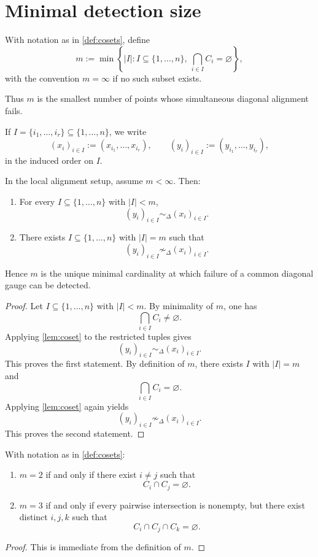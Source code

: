 \section{Minimal detection size}
\begin{definition}
	With notation as in \cref{def:cosets}, define
	\[
		m
		:=
		\min
		\left\{
		|I|:
		I\subseteq\{1,\dots,n\},
		\ \bigcap_{i\in I}C_i=\varnothing
		\right\},
	\]
	with the convention \(m=\infty\) if no such subset exists.
\end{definition}
Thus \(m\) is the smallest number of points whose simultaneous diagonal
alignment fails.
\begin{remark}
	If \(I=\{i_1,\dots,i_r\}\subseteq\{1,\dots,n\}\), we write
	\[
		(x_i)_{i\in I}:=(x_{i_1},\dots,x_{i_r}),
		\qquad
		(y_i)_{i\in I}:=(y_{i_1},\dots,y_{i_r}),
	\]
	in the induced order on \(I\).
\end{remark}
\begin{theorem}
	In the local alignment setup, assume \(m<\infty\). Then:
	\begin{enumerate}
		\item For every \(I\subseteq\{1,\dots,n\}\) with \(|I|<m\),
		      \[
			      (y_i)_{i\in I}\sim_\Delta (x_i)_{i\in I}.
		      \]
		\item There exists \(I\subseteq\{1,\dots,n\}\) with \(|I|=m\) such that
		      \[
			      (y_i)_{i\in I}\not\sim_\Delta (x_i)_{i\in I}.
		      \]
	\end{enumerate}
	Hence \(m\) is the unique minimal cardinality at which failure of a
	common diagonal gauge can be detected.
\end{theorem}
\begin{proof}
	Let \(I\subseteq\{1,\dots,n\}\) with \(|I|<m\). By minimality of \(m\),
	one has
	\[
		\bigcap_{i\in I}C_i\neq\varnothing.
	\]
	Applying \cref{lem:coset} to the restricted tuples gives
	\[
		(y_i)_{i\in I}\sim_\Delta (x_i)_{i\in I}.
	\]
	This proves the first statement.
	By definition of \(m\), there exists \(I\) with \(|I|=m\) and
	\[
		\bigcap_{i\in I}C_i=\varnothing.
	\]
	Applying \cref{lem:coset} again yields
	\[
		(y_i)_{i\in I}\not\sim_\Delta (x_i)_{i\in I}.
	\]
	This proves the second statement.
\end{proof}
\begin{corollary}[\(m=2\) and \(m=3\) regimes]
	With notation as in \cref{def:cosets}:
	\begin{enumerate}
		\item \(m=2\) if and only if there exist \(i\neq j\) such that
		      \[
			      C_i\cap C_j=\varnothing.
		      \]
		\item \(m=3\) if and only if every pairwise intersection is nonempty,
		      but there exist distinct \(i,j,k\) such that
		      \[
			      C_i\cap C_j\cap C_k=\varnothing.
		      \]
	\end{enumerate}
\end{corollary}
\begin{proof}
	This is immediate from the definition of \(m\).
\end{proof}
